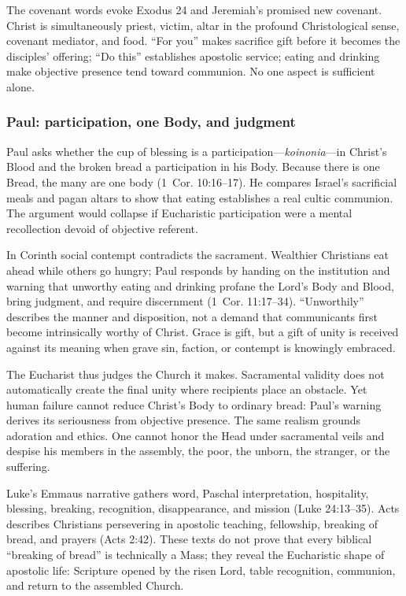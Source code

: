 The covenant words evoke Exodus 24 and Jeremiah's promised new covenant. Christ is simultaneously priest, victim, altar in the profound Christological sense, covenant mediator, and food. ``For you'' makes sacrifice gift before it becomes the disciples' offering; ``Do this'' establishes apostolic service; eating and drinking make objective presence tend toward communion. No one aspect is sufficient alone.

\subsubsection{Paul: participation, one Body, and judgment}

Paul asks whether the cup of blessing is a participation---\emph{koinonia}---in Christ's Blood and the broken bread a participation in his Body. Because there is one Bread, the many are one body (1~Cor. 10:16--17). He compares Israel's sacrificial meals and pagan altars to show that eating establishes a real cultic communion. The argument would collapse if Eucharistic participation were a mental recollection devoid of objective referent.

In Corinth social contempt contradicts the sacrament. Wealthier Christians eat ahead while others go hungry; Paul responds by handing on the institution and warning that unworthy eating and drinking profane the Lord's Body and Blood, bring judgment, and require discernment (1~Cor. 11:17--34). ``Unworthily'' describes the manner and disposition, not a demand that communicants first become intrinsically worthy of Christ. Grace is gift, but a gift of unity is received against its meaning when grave sin, faction, or contempt is knowingly embraced.

The Eucharist thus judges the Church it makes. Sacramental validity does not automatically create the final unity where recipients place an obstacle. Yet human failure cannot reduce Christ's Body to ordinary bread: Paul's warning derives its seriousness from objective presence. The same realism grounds adoration and ethics. One cannot honor the Head under sacramental veils and despise his members in the assembly, the poor, the unborn, the stranger, or the suffering.

Luke's Emmaus narrative gathers word, Paschal interpretation, hospitality, blessing, breaking, recognition, disappearance, and mission (Luke 24:13--35). Acts describes Christians persevering in apostolic teaching, fellowship, breaking of bread, and prayers (Acts 2:42). These texts do not prove that every biblical ``breaking of bread'' is technically a Mass; they reveal the Eucharistic shape of apostolic life: Scripture opened by the risen Lord, table recognition, communion, and return to the assembled Church.

